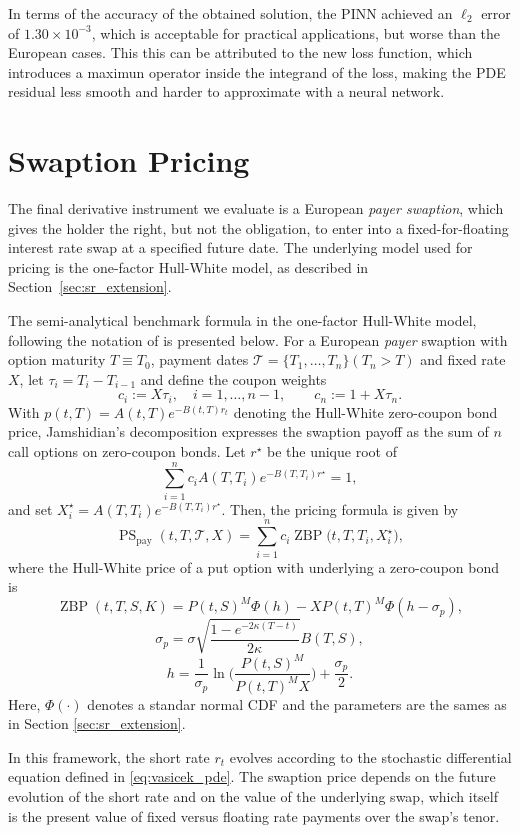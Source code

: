\documentclass[12pt]{report} %
\theoremstyle{plain} %
\theoremstyle{definition} %
\theoremstyle{remark} %
\begin{document}
In terms of the accuracy of the obtained solution, the PINN achieved an \(\ell_2\) error of 
\(1.30\times10^{-3}\), which is acceptable for practical applications, but worse than the European cases. This this can be 
attributed to the new loss function, which introduces a maximun operator inside the integrand of the loss, making the PDE residual less 
smooth and harder to approximate with a neural 
network.

\section{Swaption Pricing}

The final derivative instrument we evaluate is a European \emph{payer swaption}, which 
gives the holder the right, but not the obligation, to enter into a fixed-for-floating 
interest rate swap at a specified future date. The underlying model used for pricing is 
the one-factor Hull-White model, as described in Section~\ref{sec:sr_extension}. 

The semi-analytical benchmark formula in the one-factor Hull-White model, following the notation of \cite{brigo2013interest} is presented below.  
For a European \emph{payer} swaption with option maturity \(T\equiv T_{0}\), payment dates \(\mathcal{T}=\{T_{1},\ldots ,T_{n}\} (T_{n}>T)\) and fixed rate \(X\), let \(\tau_i=T_i-T_{i-1}\) and define the coupon weights
\[
c_i := X\tau_i,\quad i=1,\ldots ,n-1,\qquad c_n := 1+X\tau_n .
\]
With \(p(t,T)=A(t,T)e^{-B(t,T)r_t}\) denoting the Hull-White zero-coupon bond price, Jamshidian's decomposition expresses the swaption payoff as the sum of \(n\) call options on zero-coupon bonds.  Let \(r^{\star}\) be the unique root of
\[
\sum_{i=1}^{n} c_i A(T,T_i) e^{-B(T,T_i)r^{\star}} = 1,
\]
and set \(X_i^{\star}=A(T,T_i)e^{-B(T,T_i)r^{\star}}\). Then, the pricing formula is given by
\[
\operatorname{PS}_{\mathrm{pay}}(t,T,\mathcal{T},X)
        = \sum_{i=1}^{n} c_i 
          \operatorname{ZBP} \bigl(t,T,T_i,X_i^{\star}\bigr),
\]
where the Hull-White price of a put option with underlying a zero-coupon bond is
\[
\operatorname{ZBP}(t,T,S,K)=P(t,S)^M\Phi(h)-X P(t,T)^M\Phi(h-\sigma_p),
\]
\[
\sigma_p = \sigma\sqrt{\frac{1-e^{-2\kappa(T-t)}}{2\kappa}}B(T,S),
\]
\[
h = \frac{1}{\sigma_p}\operatorname{ln}\Big(\frac{P(t,S)^M}{P(t,T)^M X}\Big)+\frac{\sigma_p}{2}.
\]
Here, $\Phi(\cdot)$ denotes a standar normal CDF and the parameters are the sames as in Section \ref{sec:sr_extension}.

In this framework, the short rate \( r_t \) evolves according to the stochastic differential equation defined in 
\ref{eq:vasicek_pde}. The swaption price depends on the future evolution of the short rate and on 
the value of the underlying swap, which itself is the present value of fixed versus floating rate 
payments over the swap's tenor.
\end{document}
